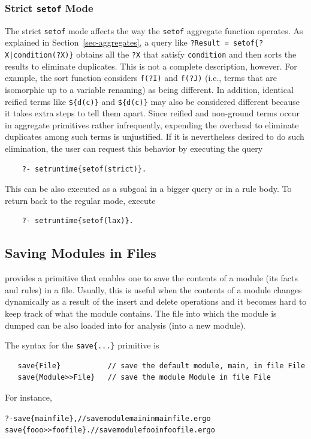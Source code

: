 \documentclass[11pt]{article}
\newcommand{\ERGO}{\mbox{\smaller{\ensuremath{\cal{E}}\smaller{{\sc{RGO}}}}}\xspace}
\newcommand{\FLSYSTEM}{\ERGO}
\newcommand{\ergoext}{ergo\xspace}
\begin{document}
\subsubsection{Strict \texttt{setof} Mode} \label{sec-strict-setof}

The strict \texttt{setof} mode affects the way the \texttt{setof} aggregate
function operates.  
As explained in Section~\ref{sec-aggregates},
a query like \texttt{?Result = setof\{?X|condition(?X)\}} obtains all the
\texttt{?X} that satisfy \texttt{condition} and then sorts the results to
eliminate duplicates. This is not a complete description, however.
For example, the sort function considers \texttt{f(?I)} and \texttt{f(?J)}
(i.e., terms that are isomorphic up to a variable renaming) as being
different. In addition, identical reified terms like \texttt{\$\{d(c)\}} and
\texttt{\$\{d(c)\}} may also be considered different because it takes  extra
steps to tell them apart. Since reified and non-ground
terms occur in aggregate primitives
rather infrequently, expending the overhead to eliminate duplicates among
such terms is unjustified. If it is nevertheless desired to do such
elimination, the user can request this behavior by executing the query
\begin{verbatim}
    ?- setruntime{setof(strict)}.
\end{verbatim}
This can be also executed as a subgoal in a bigger query or in a rule body.
To return back to the regular mode, execute
\begin{verbatim}
    ?- setruntime{setof(lax)}.
\end{verbatim}


\subsection{Saving Modules in Files}

\FLSYSTEM provides a primitive that enables one to save the contents of a
module (its facts and rules) in a file. Usually, this is useful when the
contents of a module changes dynamically as a result of the insert and
delete operations and it becomes hard to keep track of what the module
contains.  The file into which the module is dumped can be also loaded into
\FLSYSTEM for analysis (into a new module).

The syntax for the \texttt{save\{...\}}  primitive is 
\begin{verbatim}
   save{File}           // save the default module, main, in file File
   save{Module>>File}   // save the module Module in file File
\end{verbatim}
For instance,
\begin{alltt}
    ?- save\{mainfile\},     // save module main in mainfile.\ergoext
       save\{fooo>>foofile\}. // save module foo in foofile.\ergoext
\end{alltt}
\end{document}
